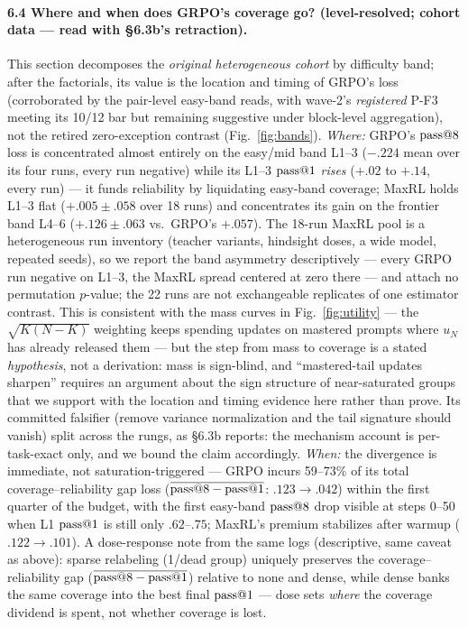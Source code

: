 \paragraph{6.4 Where and when does GRPO's coverage go? (level-resolved;
cohort data --- read with \S 6.3b's retraction).}
This section decomposes the \emph{original heterogeneous cohort} by
difficulty band; after the factorials, its value is the location and
timing of GRPO's loss (corroborated by the pair-level easy-band reads,
with wave-2's \emph{registered} P-F3 meeting its 10/12 bar but remaining
suggestive under block-level aggregation), not
the retired zero-exception contrast (Fig.~\ref{fig:bands}). \emph{Where:} GRPO's $\text{pass@}8$
loss is concentrated almost entirely on the easy/mid band L1--3
($-.224$ mean over its four runs, every run negative) while its L1--3
$\text{pass@}1$ \emph{rises} ($+.02$ to $+.14$, every run) --- it funds
reliability by liquidating easy-band coverage; MaxRL holds L1--3 flat
($+.005{\pm}.058$ over 18 runs) and concentrates its gain on the
frontier band L4--6 ($+.126{\pm}.063$ vs.\ GRPO's $+.057$). The
18-run MaxRL pool is a heterogeneous run inventory (teacher variants,
hindsight doses, a wide model, repeated seeds), so we report the band
asymmetry descriptively --- every GRPO run negative on L1--3, the
MaxRL spread centered at zero there --- and attach no permutation
$p$-value; the 22 runs are not exchangeable replicates of one
estimator contrast. This is consistent with the mass curves in Fig.~\ref{fig:utility} ---
the $\sqrt{K(N{-}K)}$ weighting keeps spending updates on mastered
prompts where $u_N$ has already released them --- but the step from
mass to coverage is a stated \emph{hypothesis}, not a derivation: mass
is sign-blind, and ``mastered-tail updates sharpen'' requires an
argument about the sign structure of near-saturated groups that we
support with the location and timing evidence here rather than prove.
Its committed falsifier (remove variance normalization and the tail
signature should vanish) split across the rungs, as \S 6.3b reports:
the mechanism account is per-task-exact only, and we bound the claim
accordingly.
\emph{When:} the divergence is immediate, not saturation-triggered ---
GRPO incurs 59--73\% of its total coverage--reliability gap loss
($\overline{\text{pass@}8-\text{pass@}1}$: $.123\to.042$) within the first
quarter of the budget, with the first easy-band $\text{pass@}8$ drop
visible at steps 0--50 when L1 $\text{pass@}1$ is still only $.62$--$.75$;
MaxRL's premium stabilizes after warmup ($.122\to.101$). A
dose-response note from the same logs (descriptive, same caveat as
above): sparse relabeling (1/dead group) uniquely preserves the
coverage--reliability gap ($\overline{\text{pass@}8-\text{pass@}1}$) relative to none and dense, while dense banks the
same coverage into the best final $\text{pass@}1$ --- dose sets
\emph{where} the coverage dividend is spent, not whether coverage is
lost.

